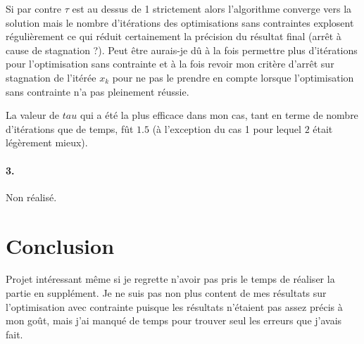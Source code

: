 \documentclass[12pt]{article}	%
\begin{document}
Si par contre $\tau$ est au dessus de 1 strictement alors l'algorithme converge vers la solution mais le nombre d'itérations des optimisations sans contraintes explosent régulièrement ce qui réduit certainement la précision du résultat final (arrêt à cause de stagnation ?).
Peut être aurais-je dû à la fois permettre plus d'itérations pour l'optimisation sans contrainte et à la fois revoir mon critère d'arrêt sur stagnation de l'itérée $x_k$ pour ne pas le prendre en compte lorsque l'optimisation sans contrainte n'a pas pleinement réussie.

La valeur de $tau$ qui a été la plus efficace dans mon cas, tant en terme de nombre d'itérations que de temps, fût $1.5$ (à l'exception du cas 1 pour lequel $2$ était légèrement mieux).

\paragraph{3.}
Non réalisé.

\section{Conclusion}
Projet intéressant même si je regrette n'avoir pas pris le temps de réaliser la partie en supplément. Je ne suis pas non plus content de mes résultats sur l'optimisation avec contrainte puisque les résultats n'étaient pas assez précis à mon goût, mais j'ai manqué de temps pour trouver seul les erreurs que j'avais fait.

%
\end{document}
